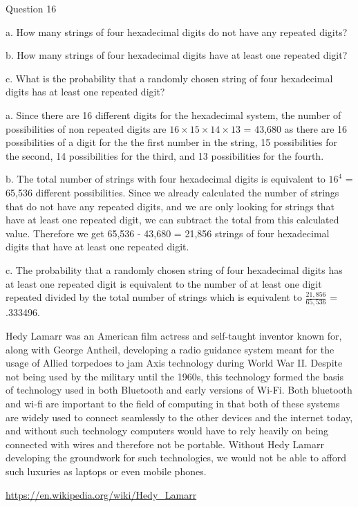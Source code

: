 \documentclass{article}
\begin{document}
\clearpage
{} Question 16
\item[]a. How many strings of four hexadecimal digits do not have any repeated digits?
\item[]b. How many strings of four hexadecimal digits have at least one repeated digit?
\item[]c. What is the probability that a randomly chosen string of four hexadecimal digits has at least one repeated digit?
\item[]a. Since there are 16 different digits for the hexadecimal system, the number of possibilities of non repeated digits are $16 \times 15 \times 14 \times 13$ = 43,680 as there are 16 possibilities of a digit for the the first number in the string, 15 possibilities for the second, 14 possibilities for the third, and 13 possibilities for the fourth.
\item[]b. The total number of strings with four hexadecimal digits is equivalent to $16^{4}$ = 65,536 different possibilities. Since we already calculated the number of strings that do not have any repeated digits, and we are only looking for strings that have at least one repeated digit, we can subtract the total from this calculated value. Therefore we get 65,536 - 43,680 = 21,856 strings of four hexadecimal digits that have at least one repeated digit.
\item[]c. The probability that a randomly chosen string of four hexadecimal digits has at least one repeated digit is equivalent to the number of at least one digit repeated divided by the total number of strings which is equivalent to $\frac{21,856}{65,536}$ = .333496.


\clearpage
\header
Hedy Lamarr was an American film actress and self-taught inventor known for, along with George Antheil, developing a radio guidance system meant for the usage of Allied torpedoes to jam Axis technology during World War II. Despite not being used by the military until the 1960s, this technology formed the basis of technology used in both Bluetooth and early versions of Wi-Fi. Both bluetooth and wi-fi are important to the field of computing in that both of these systems are widely used to connect seamlessly to the other devices and the internet today, and without such technology computers would have to rely heavily on being connected with wires and therefore not be portable. Without Hedy Lamarr developing the groundwork for such technologies, we would not be able to afford such luxuries as laptops or even mobile phones.  
\item[]\url{https://en.wikipedia.org/wiki/Hedy_Lamarr}
\end{document}
